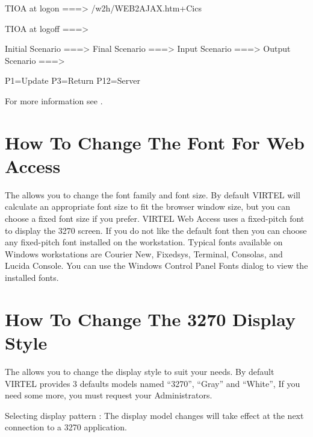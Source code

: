 \documentclass[letterpaper,10pt,english]{sphinxmanual}
\begin{document}
TIOA at logon    ===\textgreater{} /w2h/WEB2AJAX.htm+Cics

TIOA at logoff   ===\textgreater{}

Initial Scenario ===\textgreater{}                   Final Scenario ===\textgreater{}
Input Scenario   ===\textgreater{}                   Output Scenario ===\textgreater{}

P1=Update                         P3=Return                           P12=Server


For more information see {\hyperref[\detokenize{User_Guide:v457ug-url-formats}]{}}.


\section{How To Change The Font For Web Access}
\label{\detokenize{User_Guide:how-to-change-the-font-for-web-access}}
The {\hyperref[\detokenize{User_Guide:v457ug-settings-menu}]{}} allows you to change the font family and font size. By default VIRTEL will
calculate an appropriate font size to fit the browser window size, but you can choose a fixed font size if you prefer.
VIRTEL Web Access uses a fixed-pitch font to display the 3270 screen. If you do not like the default font then you can
choose any fixed-pitch font installed on the workstation. Typical fonts available on Windows workstations are Courier
New, Fixedsys, Terminal, Consolas, and Lucida Console. You can use the Windows Control Panel \textendash{} Fonts dialog to view
the installed fonts.


\section{How To Change The 3270 Display Style}
\label{\detokenize{User_Guide:how-to-change-the-3270-display-style}}
The {\hyperref[\detokenize{User_Guide:v457ug-settings-menu}]{}} allows you to change the display style to suit your needs. By default VIRTEL
provides 3 defaults models named “3270”, “Gray” and “White”, If you need some more, you must request your
Administrators.

Selecting display pattern : The display model changes will take effect at the next connection to a 3270 application.
\end{document}
